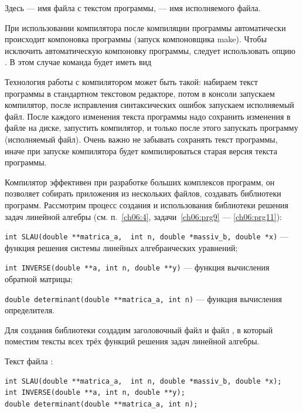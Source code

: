
Здесь  --- имя файла с текстом программы,  --- имя исполняемого файла. 

При использовании компилятора  после компиляции программы автоматически происходит компоновка программы (запуск
компоновщика make). Чтобы исключить автоматическую компоновку программы, следует использовать опцию . В этом случае
команда будет иметь вид  


Технология работы с компилятором  может быть такой: набираем текст программы в стандартном текстовом редакторе, потом
в консоли запускаем компилятор, после исправления синтаксических ошибок запускаем исполняемый файл.  После каждого
изменения текста программы надо сохранить изменения в файле на диске, запустить компилятор, и только после этого
запускать программу (исполняемый файл). Очень важно не забывать сохранять текст программы, иначе при запуске
компилятора будет компилироваться старая версия текста программы. 


Компилятор  эффективен при разработке больших комплексов программ, он позволяет собирать приложения из нескольких
файлов, создавать библиотеки программ. Рассмотрим процесс создания и использования библиотеки решения задач линейной
алгебры (см. п.~\ref{ch06:4}, задачи~\ref{ch06:prg9} --- \ref{ch06:prg11}):

\lstinline!int SLAU(double **matrica_a,  int n, double *massiv_b, double *x)! --- функция решения системы линейных
алгебраических уравнений;

\lstinline!int INVERSE(double **a, int n, double **y)! --- функция вычисления обратной матрицы;

\lstinline!double determinant(double **matrica_a, int n)! --- функция вычисления определителя.


Для создания библиотеки создадим заголовочный файл  и файл  , в
который поместим тексты всех трёх функций решения задач линейной алгебры.

Текст файла :
\begin{lstlisting}
int SLAU(double **matrica_a,  int n, double *massiv_b, double *x);
int INVERSE(double **a, int n, double **y);
double determinant(double **matrica_a, int n);
\end{lstlisting}

